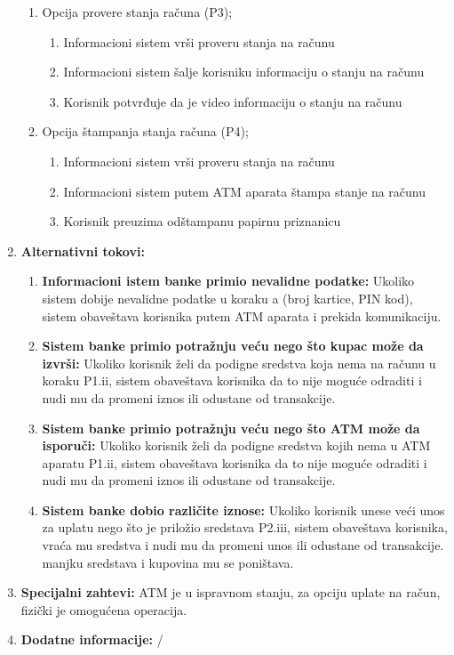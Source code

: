 \documentclass{article}
\begin{document}
\begin{enumerate}
\begin{enumerate}
        \item Opcija provere stanja računa (P3);
         
        \begin{enumerate}
          \item Informacioni sistem vrši proveru stanja na računu
          \item Informacioni sistem šalje korisniku informaciju o stanju na računu
          \item Korisnik potvrđuje da je video informaciju o stanju na računu
        \end{enumerate}
        
        \item Opcija štampanja stanja računa (P4);
         
        \begin{enumerate}
          \item Informacioni sistem vrši proveru stanja na računu
          \item Informacioni sistem putem ATM aparata štampa stanje na računu
          \item Korisnik preuzima odštampanu papirnu priznanicu
        \end{enumerate}
      \end{enumerate}
  \item \textbf{Alternativni tokovi: } 
  \begin{enumerate}
    \item \textbf{Informacioni istem banke primio nevalidne podatke:} Ukoliko sistem dobije nevalidne podatke u koraku a (broj kartice, PIN kod), sistem obaveštava korisnika putem ATM aparata i prekida komunikaciju.
    \item \textbf{Sistem banke primio potražnju veću nego što kupac može da izvrši: } Ukoliko korisnik želi da podigne sredstva koja nema na računu u koraku P1.ii, sistem obaveštava korisnika da to nije moguće odraditi i nudi mu da promeni iznos ili odustane od transakcije.
    \item \textbf{Sistem banke primio potražnju veću nego što ATM može da isporuči: } Ukoliko korisnik želi da podigne sredstva kojih nema u ATM aparatu P1.ii, sistem obaveštava korisnika da to nije moguće odraditi i nudi mu da promeni iznos ili odustane od transakcije.
    \item \textbf{Sistem banke dobio različite iznose: } Ukoliko korisnik unese veći unos za uplatu nego što je priložio sredstava P2.iii, sistem obaveštava korisnika, vraća mu sredstva i nudi mu da promeni unos ili odustane od transakcije.
    manjku sredstava i kupovina mu se poništava.
\end{enumerate}
  \item \textbf{Specijalni zahtevi: } ATM je u ispravnom stanju, za opciju uplate na račun, fizički je omogućena operacija.
  \item \textbf{Dodatne informacije: } /
\end{enumerate}
\end{document}
